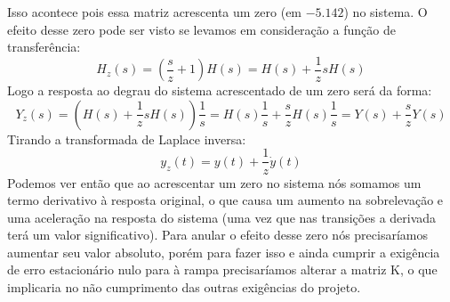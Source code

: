 \documentclass{article}
\begin{document}
Isso acontece pois essa matriz acrescenta um zero (em $- 5.142$) no sistema. O efeito desse zero pode ser visto se levamos em consideração a função de transferência:
\begin{equation}
	H_z(s) = (\frac{s}{z} + 1)H(s) = H(s) + \frac{1}{z}sH(s)
\end{equation}
Logo a resposta ao degrau do sistema acrescentado de um zero será da forma:
\begin{equation}
Y_z(s) = (H(s) + \frac{1}{z}sH(s))\frac{1}{s} = H(s)\frac{1}{s} + \frac{s}{z}H(s)\frac{1}{s} = Y(s) + \frac{s}{z}Y(s)
\end{equation}
Tirando a transformada de Laplace inversa:
\begin{equation}
y_z(t) = y(t) + \frac{1}{z}\dot{y}(t)
\end{equation}
Podemos ver então que ao acrescentar um zero no sistema nós somamos um termo derivativo à resposta original, o que causa um aumento na sobrelevação e uma aceleração na resposta do sistema (uma vez que nas transições a derivada terá um valor significativo). Para anular o efeito desse zero nós precisaríamos aumentar seu valor absoluto, porém para fazer isso e ainda cumprir a exigência de erro estacionário nulo para à rampa precisaríamos alterar a matriz K, o que implicaria no não cumprimento das outras exigências do projeto.
\begin{thebibliography}{widestlabel}
\end{thebibliography}
\end{document}
